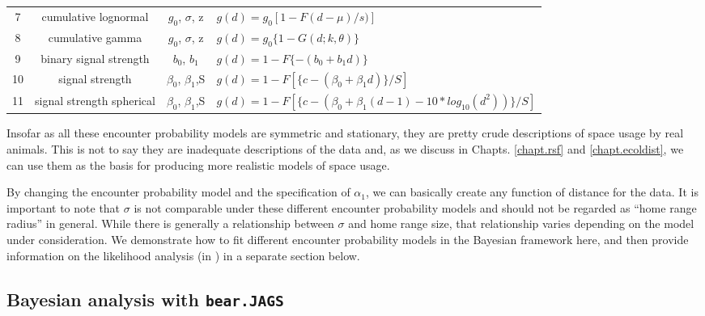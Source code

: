\begin{table}[ht]
\begin{tabular}{cccl}
7 &cumulative lognormal     & $g_0$, $\sigma$, z & $g(d) = g_0 [1 -F{(d-\mu)/s)}]$  \\
8 &cumulative gamma         & $g_0$, $\sigma$, z  & $g(d) = g_0 \{ 1 - G (d; k,  \theta) \}$  \\
9 &binary signal strength   & $b_0$, $b_1$       & $g(d) = 1 - F \{- (b_0 + b_1 d) \}$ \\
10&signal strength          & $\beta_0$, $\beta_1$,S  &
  $g(d) = 1 - F[ \{c - (\beta_0 + \beta_1 d)\} / S]$  \\
11&signal strength spherical&  $\beta_0$, $\beta_1$,S & 
\parbox[t]{2in}{ $g(d) = 1 - F[\{c - (\beta_0 + \beta_1(d-1)- 10 * log_{10} ( d^2 ) ) \} / S]$ 
} \\ \hline
\end{tabular}
\label{covariates.tab.detmodels}
\end{table}


Insofar as all these encounter probability models
are symmetric and stationary, they are pretty
crude descriptions of space usage by real animals. This is not to
say they are inadequate descriptions of the data and, as we discuss in
Chapts. \ref{chapt.rsf} and \ref{chapt.ecoldist}, we can use them as the
basis for producing more realistic models of space usage.  

By changing the encounter probability model
and the specification of
$\alpha_1$, we can basically create any function of distance for the
data. It is important to note that $\sigma$ is not comparable under
these different encounter probability models
and should not be
regarded as ``home range radius'' in general.  While there is
generally a relationship between $\sigma$ and home range size, that
relationship varies depending on the model under consideration. We
demonstrate how to fit different encounter probability models
 in the Bayesian
framework here, and then provide information on the likelihood analysis
(in \secr) in a separate section below.

\subsection{Bayesian analysis with {\tt bear.JAGS}}

